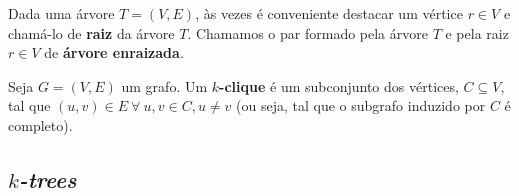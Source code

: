Dada uma árvore $T = (V, E)$, às vezes é conveniente destacar um vértice $r \in V$ e chamá-lo de \textbf{raiz} da árvore $T$. Chamamos o par formado pela árvore $T$ e pela raiz $r \in V$ de \textbf{árvore enraizada}.

\begin{definition}[$k$-clique]
  Seja $G = (V, E)$ um grafo. Um \textbf{$k$-clique} é um subconjunto dos vértices, $C \subseteq V$, tal que $(u, v) \in E \ \forall \ u, v \in C, u \neq v$ (ou seja, tal que o subgrafo induzido por $C$ é completo).
\end{definition}

\subsection{\emph{$k$-trees}}

